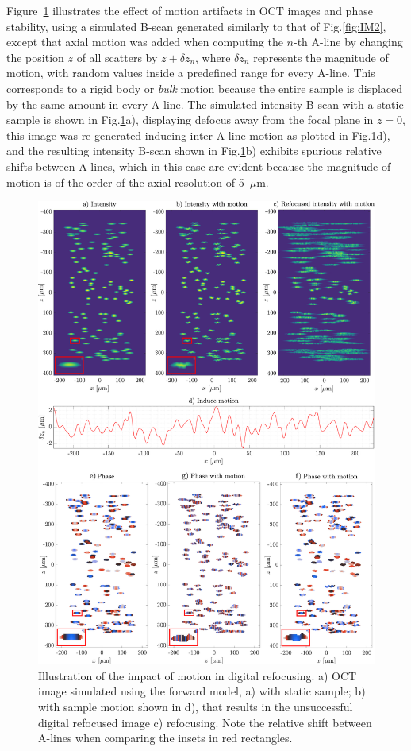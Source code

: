 Figure~\ref{fig:motionEx} illustrates the effect of motion artifacts in OCT images and phase stability, using a simulated B-scan generated similarly to that of Fig.\ref{fig:IM2}, except that axial motion was added when computing the $n$-th A-line by changing the position $z$ of all scatters by $z + \delta z_n$, where $\delta z_n$ represents the magnitude of motion, with random values inside a predefined range for every A-line. This corresponds to a rigid body or \textit{bulk} motion because the entire sample is displaced by the same amount in every A-line. The simulated intensity B-scan with a static sample is shown in Fig.\ref{fig:motionEx}a), displaying defocus away from the focal plane in $z=0$, this image was re-generated inducing inter-A-line motion as plotted in Fig.\ref{fig:motionEx}d), and the resulting intensity B-scan shown in Fig.\ref{fig:motionEx}b) exhibits spurious relative shifts between A-lines, which in this case are evident because the magnitude of motion is of the order of the axial resolution of 5~$\mu$m.
\begin{figure}[htb!]
	\centering
	\includegraphics[width=.95\textwidth]{Figures/TheoreticalBasis/MotionEx.pdf}
	\caption{Illustration of the impact of motion in digital refocusing. a) OCT image simulated using the forward model, a) with static sample; b) with sample motion shown in d), that results in the unsuccessful digital refocused image c) refocusing. Note the relative shift between A-lines when comparing the insets in red rectangles.}
	\label{fig:motionEx}
\end{figure}

